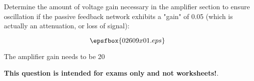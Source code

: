 

Determine the amount of voltage gain necessary in the amplifier section to ensure oscillation if the passive feedback network exhibits a "gain" of 0.05 (which is actually an attenuation, or loss of signal):

$$\epsfbox{02609x01.eps}$$







The amplifier gain needs to be 20







{\bf This question is intended for exams only and not worksheets!}.





